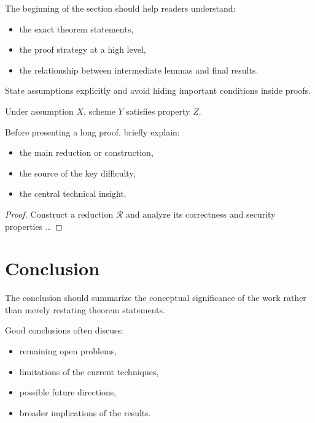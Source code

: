 \documentclass[
    letterpaper,
    runningheads,
    USenglish
  ]{llncs}
\begin{document}
The beginning of the section should help readers understand:
\begin{itemize}
	\item the exact theorem statements,
	\item the proof strategy at a high level,
	\item the relationship between intermediate lemmas and final results.
\end{itemize}

State assumptions explicitly and avoid hiding important conditions inside
proofs.

\begin{theorem}
	\label{thm:main}
	Under assumption $X$, scheme $Y$ satisfies property $Z$.
\end{theorem}

Before presenting a long proof, briefly explain:
\begin{itemize}
	\item the main reduction or construction,
	\item the source of the key difficulty,
	\item the central technical insight.
\end{itemize}

\begin{proof}
	Construct a reduction $\mathcal{R}$ and analyze its correctness and
	security properties \ldots
\end{proof}


\section{Conclusion}
\label{sec:conclusion}

The conclusion should summarize the conceptual significance of the work
rather than merely restating theorem statements.

Good conclusions often discuss:
\begin{itemize}
	\item remaining open problems,
	\item limitations of the current techniques,
	\item possible future directions,
	\item broader implications of the results.
\end{itemize}
\end{document}
